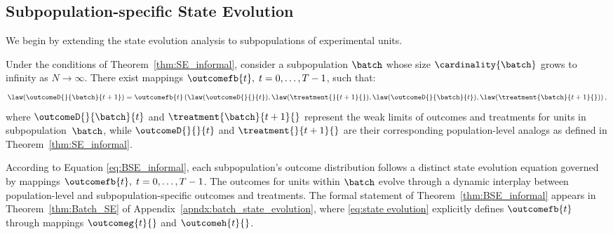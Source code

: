 \subsection{Subpopulation-specific State Evolution}
\label{sec:BSE}
%
We begin by extending the state evolution analysis to subpopulations of experimental units.
% 
\begin{theorem}
    \label{thm:BSE_informal}
Under the conditions of Theorem~\ref{thm:SE_informal}, consider a subpopulation $\batch$ whose size $\cardinality{\batch}$ grows to infinity as $N \to \infty$. There exist mappings $\outcomefb{t},\; t=0, \ldots, T-1$, such that:
    \begin{equation}
        \label{eq:BSE_informal}
        \law(
        \outcomeD{}{\batch}{t+1})
        =
        \outcomefb{t}
        \left(
        \law(
        \outcomeD{}{}{t}
        ),
        \law(
        \treatment{}{t+1}{}
        ),
        \law(
        \outcomeD{}{\batch}{t}
        ),
        \law(
        \treatment{\batch}{t+1}{}
        )
        \right),
    \end{equation}
    where $\outcomeD{}{\batch}{t}$ and $\treatment{\batch}{t+1}{}$ represent the weak limits of outcomes and treatments for units in subpopulation~$\batch$, while $\outcomeD{}{}{t}$ and $\treatment{}{t+1}{}$ are their corresponding population-level analogs as defined in Theorem~\ref{thm:SE_informal}.
\end{theorem}
% 
According to Equation \eqref{eq:BSE_informal}, each subpopulation's outcome distribution follows a distinct state evolution equation governed by mappings $\outcomefb{t},\; t=0, \ldots, T-1$. The outcomes for units within $\batch$ evolve through a dynamic interplay between population-level and subpopulation-specific outcomes and treatments. The formal statement of Theorem~\ref{thm:BSE_informal} appears in Theorem~\ref{thm:Batch_SE} of Appendix~\ref{apndx:batch_state_evolution}, where \eqref{eq:state evolution} explicitly defines $\outcomefb{t}$ through mappings $\outcomeg{t}{}$ and $\outcomeh{t}{}$.

